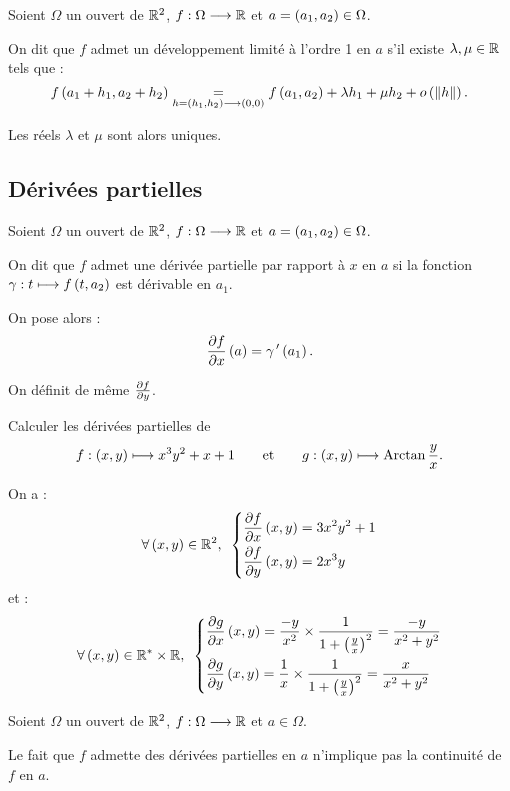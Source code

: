\begin{defi}
Soient \(\Omega\) un ouvert de \(\mathbb{R}^2\), \(f:\Omega\longrightarrow\mathbb{R}\) et \(a=\left(a_1,a_2\right)\in\Omega\).

On dit que \(f\) admet un développement limité à l'ordre 1 en \(a\) s'il existe \(\lambda,\mu\in\mathbb{R}\) tels que : \[f\left(a_1+h_1,a_2+h_2\right)\underset{h=\left(h_1,h_2\right)\longrightarrow\left(0,0\right)}{=}f\left(a_1,a_2\right)+\lambda h_1+\mu h_2+o\left(\left\|h\right\|\right).\]

Les réels \(\lambda\) et \(\mu\) sont alors uniques.
\end{defi}

\subsection{Dérivées partielles}

\begin{defi}
Soient \(\Omega\) un ouvert de \(\mathbb{R}^2\), \(f:\Omega\longrightarrow\mathbb{R}\) et \(a=\left(a_1,a_2\right)\in\Omega\).

On dit que \(f\) admet une dérivée partielle par rapport à \(x\) en \(a\) si la fonction \(\gamma:t\longmapsto f\left(t,a_2\right)\) est dérivable en \(a_1\).

On pose alors : \[\pdv{f}{x}\left(a\right)=\gamma^{\,\prime}\left(a_1\right).\]

On définit de même \(\pdv{f}{y}\).
\end{defi}


\begin{exoex}
Calculer les dérivées partielles de \[f:\left(x,y\right)\longmapsto x^3y^2+x+1\qquad\text{et}\qquad g:\left(x,y\right)\longmapsto\operatorname{Arctan}\dfrac{y}{x}.\]
\end{exoex}


\begin{corr}
On a : \[\quantifs{\forall\paren{x,y}\in\R^2}\begin{dcases}
\pdv{f}{x}\paren{x,y}=3x^2y^2+1 \\
\pdv{f}{y}\paren{x,y}=2x^3y
\end{dcases}\] et : \[\quantifs{\forall\paren{x,y}\in\Rs\times\R}\begin{dcases}
\pdv{g}{x}\paren{x,y}=\dfrac{-y}{x^2}\times\dfrac{1}{1+\paren{\frac{y}{x}}^2}=\dfrac{-y}{x^2+y^2} \\
\pdv{g}{y}\paren{x,y}=\dfrac{1}{x}\times\dfrac{1}{1+\paren{\frac{y}{x}}^2}=\dfrac{x}{x^2+y^2}
\end{dcases}\]
\end{corr}


\begin{rem}
Soient \(\Omega\) un ouvert de \(\mathbb{R}^2\), \(f:\Omega\longrightarrow\mathbb{R}\) et \(a\in\Omega\).

Le fait que \(f\) admette des dérivées partielles en \(a\) n'implique pas la continuité de \(f\) en \(a\).
\end{rem}

